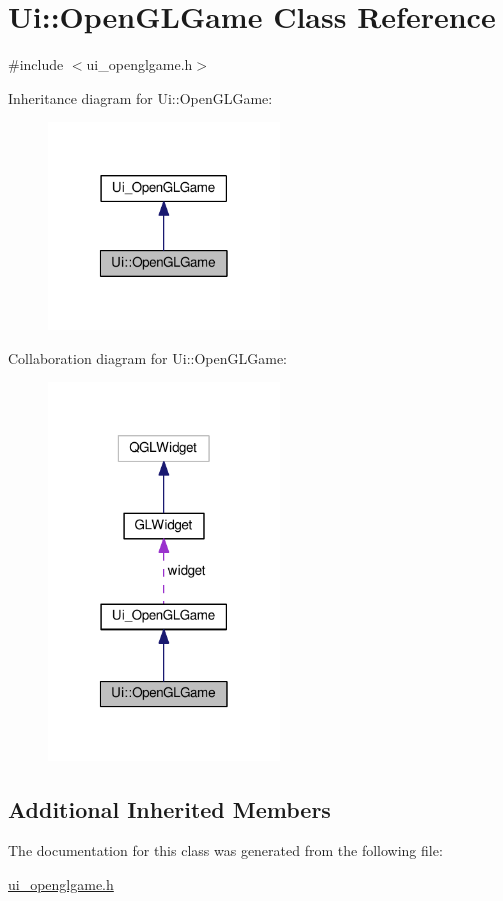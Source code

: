 \hypertarget{classUi_1_1OpenGLGame}{\section{Ui\-:\-:Open\-G\-L\-Game Class Reference}
\label{classUi_1_1OpenGLGame}
}


{\ttfamily \#include $<$ui\-\_\-openglgame.\-h$>$}



Inheritance diagram for Ui\-:\-:Open\-G\-L\-Game\-:\nopagebreak
\begin{figure}[H]
\begin{center}
\leavevmode
\includegraphics[width=174pt]{classUi_1_1OpenGLGame__inherit__graph}
\end{center}
\end{figure}


Collaboration diagram for Ui\-:\-:Open\-G\-L\-Game\-:\nopagebreak
\begin{figure}[H]
\begin{center}
\leavevmode
\includegraphics[width=174pt]{classUi_1_1OpenGLGame__coll__graph}
\end{center}
\end{figure}
\subsection*{Additional Inherited Members}


The documentation for this class was generated from the following file\-:\begin{DoxyCompactItemize}
\item 
\hyperlink{ui__openglgame_8h}{ui\-\_\-openglgame.\-h}\end{DoxyCompactItemize}
